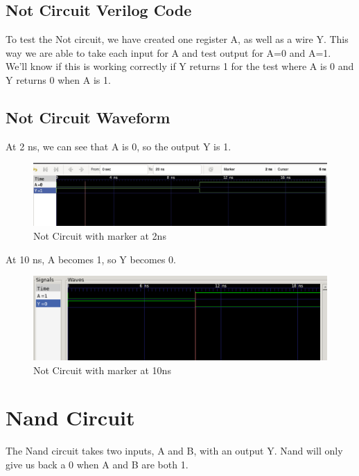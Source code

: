 \documentclass[12pt]{article}
\begin{document}
\subsection{Not Circuit Verilog Code}


To test the Not circuit, we have created one register A, as well as a wire Y. This way we are able to take each input for A and test output for A=0 and A=1. We'll know if this is working correctly if Y returns 1 for the test where A is 0 and Y returns 0 when A is 1.


\subsection{Not Circuit Waveform}
At 2 ns, we can see that  A is 0, so the output Y is 1.
\begin{figure}[H]
    \centering
    \includegraphics[width = 1.0\textwidth]{not/not_wave.PNG}
    \caption{Not Circuit with marker at 2ns}
    \label{fig:enter-label}
\end{figure}

At 10 ns, A becomes 1, so Y becomes 0.
\begin{figure}[H]
    \centering
    \includegraphics[width = 1.0\textwidth]{not/not_wave1.png}
    \caption{Not Circuit with marker at 10ns}
    \label{fig:enter-label}
\end{figure}

\section{Nand Circuit}
The Nand circuit takes two inputs, A and B, with an output Y. Nand will only give us back a 0 when A and B are both 1.
\end{document}
